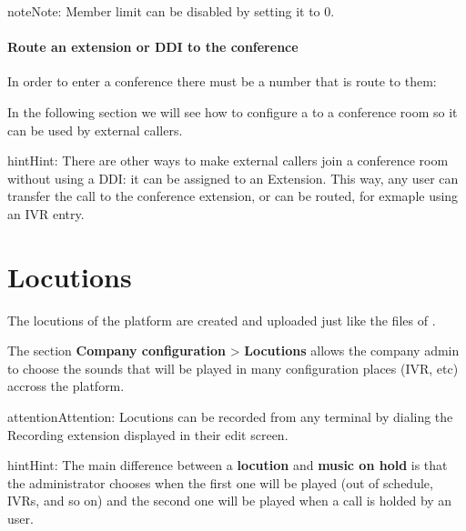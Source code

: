 \documentclass[letterpaper,10pt,english]{sphinxmanual}
\begin{document}
\begin{notice}{note}{Note:}
Member limit can be disabled by setting it to 0.
\end{notice}
\paragraph{Route an extension or DDI to the conference}

In order to enter a conference there must be a number that is route to them:

\noindent{}

In the following section we will see how to configure a {\hyperref[company/ddis:ddis]{}} to a conference room so it can be used by external callers.

\begin{notice}{hint}{Hint:}
There are other ways to make external callers join a conference room
without using a DDI: it can be assigned to an Extension. This way, any user
can transfer the call to the conference extension, or can be routed, for
exmaple using an IVR entry.
\end{notice}


\section{Locutions}
\label{company/locutions:locutions}\label{company/locutions::doc}
The locutions of the platform are created and uploaded just like the files of
{\hyperref[company/music_on_hold:musiconhold]{}}.

The section \textbf{Company configuration} \textgreater{} \textbf{Locutions}  allows the company admin
to choose the sounds that will be played in many configuration places (IVR, etc)
accross the platform.

\noindent{}

\begin{notice}{attention}{Attention:}
Locutions can be recorded from any terminal by dialing the
Recording extension displayed in their edit screen.
\end{notice}

\begin{notice}{hint}{Hint:}
The main difference between a \textbf{locution} and \textbf{music on hold} is
that the administrator chooses when the first one will be played (out of
schedule, IVRs, and so on) and the second one will be played when a call is
holded by an user.
\end{notice}
\end{document}
